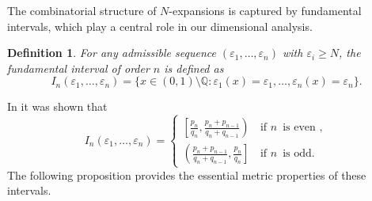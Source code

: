 \documentclass[12pt]{article}
\newtheorem{definition}[theorem]{Definition}
\newcommand{\Q}{\mathbb{Q}}
\numberwithin{equation}{section}
\begin{document}
The combinatorial structure of $N$-expansions is captured by fundamental intervals, which play a central role in our dimensional analysis.

\begin{definition} \label{def.3.2}
For any admissible sequence $(\varepsilon_1, \ldots, \varepsilon_n)$ with $\varepsilon_i \geq N$, the \emph{fundamental interval} of order $n$ is defined as
\[
I_n(\varepsilon_1, \ldots, \varepsilon_n) = \{ x \in (0,1) \setminus \Q : \varepsilon_1(x) = \varepsilon_1, \ldots, \varepsilon_n(x) = \varepsilon_n \}.
\]
\end{definition}

In \cite{Lascu2017} it was shown that 
%
\begin{equation} \label{3.1}
 I_n(\varepsilon_1, \ldots, \varepsilon_n) = \begin{cases}
\left[\displaystyle \frac{p_n}{q_n}, \frac{p_n+p_{n-1}}{q_n+q_{n-1}} \right)  & \, \text{if } n \, \text{ is even }, \\
\left(\displaystyle \frac{p_n+p_{n-1}}{q_n+q_{n-1}}, \frac{p_n}{q_n} \right]  & \, \text{if } n \, \text{ is odd. }
\end{cases}
\end{equation}
%
The following proposition provides the essential metric properties of these intervals.
\end{document}
